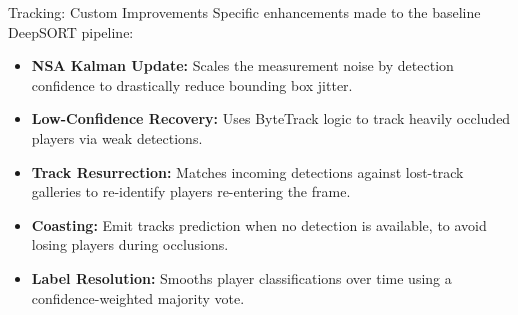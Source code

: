 \begin{frame}{Tracking: Custom Improvements}
Specific enhancements made to the baseline DeepSORT pipeline:
\begin{itemize}
  \item \textbf{NSA Kalman Update:} Scales the measurement noise by detection confidence to drastically reduce bounding box jitter.
  \item \textbf{Low-Confidence Recovery:} Uses ByteTrack \cite{bytetrack} logic to track heavily occluded players via weak detections.
  \item \textbf{Track Resurrection:} Matches incoming detections against lost-track galleries to re-identify players re-entering the frame.
  \item \textbf{Coasting:} Emit tracks prediction when no detection is available, to avoid losing players during occlusions.
  \item \textbf{Label Resolution:} Smooths player classifications over time using a confidence-weighted majority vote.
\end{itemize}
\end{frame}